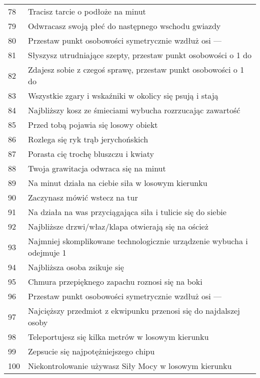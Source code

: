 \begin{longtabu}{ l l }
78			&	Tracisz tarcie o podłoże na \diiii{} minut \\
79			&	Odwracasz swoją płeć do następnego wschodu gwiazdy \\
80			&	Przestaw punkt osobowości symetrycznie wzdłuż osi \aba{} --- \abp{} \\
81			&	Słyszysz utrudniające szepty, przestaw punkt osobowości o 1 do \aba{} \\
82			&	Zdajesz sobie z czegoś sprawę, przestaw punkt osobowości o 1 do \abi{} \\
83			&	Wszystkie zgary i wskaźniki w okolicy się psują i stają \\
84			&	Najbliższy kosz ze śmieciami wybucha rozrzucając zawartość \\
85			&	Przed tobą pojawia się losowy obiekt \\
86			&	Rozlega się ryk trąb jerychońskich \\
87			&	Porasta cię trochę bluszczu i kwiaty \\
88			&	Twoja grawitacja odwraca się na \diiii{} minut \\
89			&	Na \diiii{} minut działa na ciebie siła w losowym kierunku \\
90			&	Zaczynasz mówić wstecz na \diiii{} tur \\
91			&	Na \dxx{} działa na was przyciągająca siła i tulicie się do siebie \\
92			&	Najbliższe drzwi/właz/klapa otwierają się na oścież \\
93			&	Najmniej skomplikowane technologicznie urządzenie wybucha i odejmuje 1 \abzyc{} \\
94			&	Najbliższa osoba zsikuje się \\
95			&	Chmura przepięknego zapachu roznosi się na boki \\
96			&	Przestaw punkt osobowości symetrycznie wzdłuż osi \abs{} --- \abi{} \\
97			&	Najcięższy przedmiot z ekwipunku przenosi się do najdalszej osoby \\
98			&	Teleportujesz się kilka metrów w losowym kierunku \\
99			&	Zepsucie się najpotężniejszego chipu \\
100			&	Niekontrolowanie używasz Siły Mocy w losowym kierunku \\
\end{longtabu}

